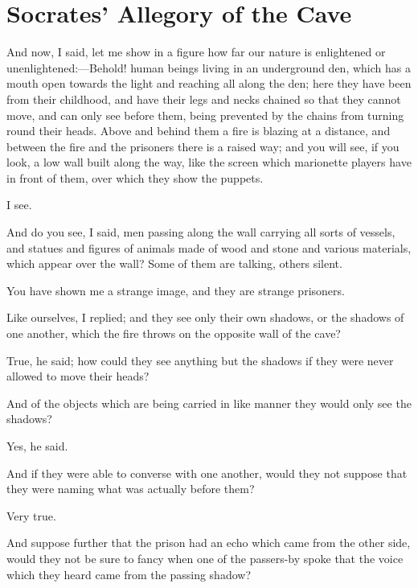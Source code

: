 
\author{Plato}
\chapter{Socrates' Allegory of the Cave}


And now, I said, let me show in a figure how far our nature is
enlightened or un\-en\-light\-ened:---Behold! human beings living in
an underground den, which has a mouth open towards the light and
reaching all along the den; here they have been from their childhood,
and have their legs and necks chained so that they cannot move, and
can only see before them, being prevented by the chains from turning
round their heads. Above and behind them a fire is blazing at a
distance, and between the fire and the prisoners there is a raised
way; and you will see, if you look, a low wall built along the way,
like the screen which marionette players have in front of them, over
which they show the puppets.

I see.

And do you see, I said, men passing along the wall carrying all sorts
of vessels, and statues and figures of animals made of wood and stone
and various materials, which appear over the wall? Some of them are
talking, others silent.

You have shown me a strange image, and they are strange prisoners.

Like ourselves, I replied; and they see only their own shadows, or the
shadows of one another, which the fire throws on the opposite wall of
the cave?

True, he said; how could they see anything but the shadows if they
were never allowed to move their heads?

And of the objects which are being carried in like manner they would
only see the shadows?

Yes, he said.

And if they were able to converse with one another, would they not
suppose that they were naming what was actually before them?

Very true.

And suppose further that the prison had an echo which came from the
other side, would they not be sure to fancy when one of the passers-by
spoke that the voice which they heard came from the passing shadow?

